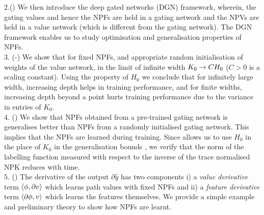 $2.$() We then introduce the deep gated networks (DGN) framework, wherein, the gating values and hence the NPFs are held in a gating network and the NPVs are held in a value network (which is different from the gating network). The DGN framework enables us to study optimisation and generalisation properties of NPFs.\\
$3.$ (-) We show that for fixed NPFs, and appropriate random initialisation of weights of the value network, in the limit of infinite width $K_0\rightarrow CH_0$ ($C>0$ is a scaling constant). Using the property of $H_0$ we conclude that for infinitely large width, increasing depth helps in training performance, and for finite widths, increasing depth beyond a point hurts training performance due to the variance in entries of $K_0$.\\
$4.$ () We show that NPFs obtained from a pre-trained gating network is generalises better than NPFs from a randomly initialised gating network. This implies that the NPFs are learned during training. Since  allows us to use $H_0$ in the place of $K_0$ in the generalisation bounds \cite{cao2019generalization}, we verify that the norm of the labelling function measured with respect to the inverse of the trace normalised NPK reduces with time.\\
$5.$ () The derivative of the output $\partial \hat{y}$ has two components i) a \emph{value derivative} term $\langle \phi,\partial v\rangle$ which learns path values with fixed NPFs and ii) a \emph{feature derivative} term $\langle \partial \phi,v\rangle$ which learns the features themselves. We provide a simple example and preliminary theory to show how NPFs are learnt.
